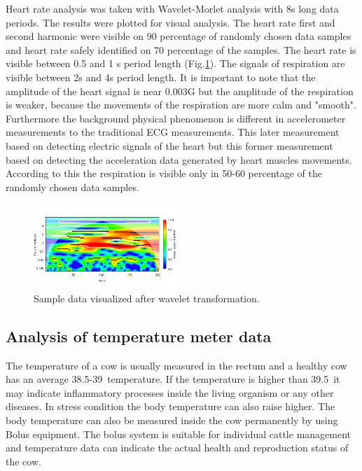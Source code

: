 \documentclass[conference]{IEEEtran}
\begin{document}
Heart rate analysis was taken with Wavelet-Morlet analysis \cite{khoor2007} with 8s long data
periods. The results were plotted for visual analysis. The heart rate first and
second harmonic were visible on 90 percentage of randomly chosen data samples
and heart rate safely identified on 70 percentage of the samples. The heart
rate is visible between 0.5 and 1 s period length (Fig.\ref{heart-wavelet}).
The signals of respiration are visible between 2s and 4s period length. It is
important to note that the amplitude of the heart signal is near 0.003G but the
amplitude of the respiration is weaker, because the movements of the
respiration are more calm and "smooth". Furthermore the background physical
phenomenon is different in accelerometer measurements to the traditional ECG
measurements. This later measurement based on detecting electric signals of the
heart but this former measurement based on detecting the acceleration data
generated by heart muscles movements.   According to this the respiration is
visible only in 50-60 percentage of the randomly chosen data samples.

\begin{figure}[htbp]
\centerline{\includegraphics[width=0.48\textwidth]{fig/Wavelet.png}}
  \caption{Sample data visualized after wavelet transformation.}
\label{heart-wavelet}
\end{figure}

\subsection{Analysis of temperature meter data}

The temperature of a cow is usually measured in the rectum and a healthy cow
has an average 38.5-39\textcelsius\  temperature. If the temperature is
higher than 39.5\textcelsius\  it may indicate inflammatory processes inside
the living organism or any other diseases. In stress condition the body
temperature can also raise higher. The body temperature can also be measured
inside the cow permanently by using Bolus equipment. The bolus system is
suitable for individual cattle management and temperature data can indicate the
actual health and reproduction status of the cow.
\end{document}
